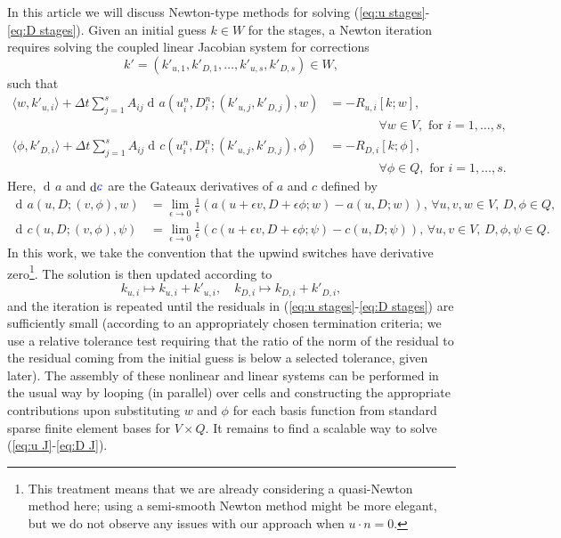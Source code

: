 \documentclass[a4paper, 12pt]{article}
\newcommand{\revisedA}[1]{#1}
\newcommand{\revisedB}[1]{#1}
\newcommand{\revisedC}[1]{{\color{blue}#1}}
\DeclareMathOperator{\diff}{d}
\DeclareMathOperator{\gat}{\diff\!}
\begin{document}
\revisedA{In this article we will discuss Newton-type methods for solving
 (\ref{eq:u stages}-\ref{eq:D
  stages}).} Given an initial guess $k\in W$ for
the stages, a Newton iteration requires solving the coupled linear
Jacobian system for corrections
\[
k' = (k'_{u,1},k'_{D,1},\ldots, k'_{u,s},k'_{D,s}) \in W,
\]
such that
\begin{align}
  \nonumber
    \langle w, k'_{u,i} \rangle +
   \Delta t \sum_{j=1}^sA_{ij}\gat a\left(u^n_i,D^n_i;(k'_{u,j}, k'_{D,j}),
   w\right) &=  -R_{u,i}[k;w], \\
   \label{eq:u J}
   & \qquad\qquad    \forall w \in V,\mbox{ for }i=1,\ldots,s, \\
   \nonumber
  \langle \phi, k'_{D,i} \rangle
  + \Delta t\sum_{j=1}^sA_{ij}\gat c\left(u^n_i,D^n_i;(k'_{u,j}, k'_{D,j}),
  \phi\right)  &= -R_{D,i}[k;\phi], \\
  & \qquad \qquad \forall \phi \in Q,\mbox{ for }i=1,\ldots,s.
    \label{eq:D J}
\end{align}
Here, $\gat a$ and $\gat \revisedC{c}$ are the Gateaux
derivatives of $a$ and $c$ defined by
\begin{align}
  \gat a(u,D;(v,\phi),w) & = \lim_{\epsilon\to 0}
  \frac{1}{\epsilon}(a(u+\epsilon v,D+\epsilon \phi; w)
  - a(u,D;w)),  \, \forall u,v,w \in V, \, D,\phi \in Q, \\
  \gat c(u,D;(v,\phi),\psi) & = \lim_{\epsilon\to 0}
  \frac{1}{\epsilon}(c(u+\epsilon v,D+\epsilon \phi; \psi)
  - c(u,D;\psi)), \, \forall u,v \in V,\, D,\phi,\psi \in Q.
\end{align}
In this work, we
take the convention that the upwind switches have derivative
zero\footnote{This treatment means that we {are already considering a
quasi-Newton method here}; using a semi-smooth Newton method might be
more elegant, but we do not observe any issues with our approach
when $u\cdot n=0$.}.
The solution is then updated according to
\begin{equation}
  k_{u,i}\mapsto k_{u,i} + k'_{u,i}, \quad
  k_{D,i}\mapsto k_{D,i} + k'_{D,i},
  \label{eq:newton update}
\end{equation}
and the iteration is repeated until the residuals in (\ref{eq:u
  stages}-\ref{eq:D stages}) are sufficiently small (according to an
appropriately chosen termination criteria\revisedB{; we use a relative
  tolerance test requiring that the ratio of the norm of the residual
  to the residual coming from the initial guess is below a selected
  tolerance, given later}). The assembly of these nonlinear and linear
systems can be performed in the usual way by looping (in parallel)
over cells and constructing the appropriate contributions upon
substituting $w$ and $\phi$ for each basis function from standard
sparse finite element bases for $V\times Q$. It remains to find a
scalable way to solve (\ref{eq:u J}-\ref{eq:D J}).
\end{document}

